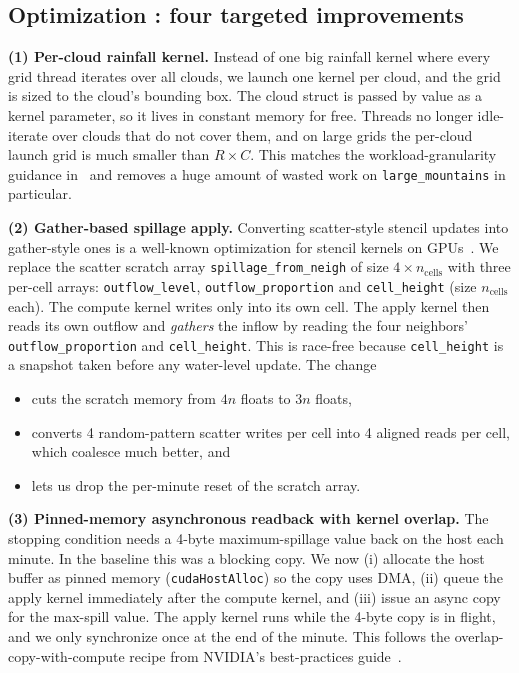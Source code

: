 \documentclass[sigconf, nonacm, review]{acmart}
\begin{document}
\subsection{Optimization : four targeted improvements}\label{sec:opt}

\textbf{(1) Per-cloud rainfall kernel.} Instead of one big
rainfall kernel where every grid thread iterates over all clouds,
we launch one kernel per cloud, and the grid is sized to
the cloud's bounding box. The cloud struct is passed by value as
a kernel parameter, so it lives in constant memory for free.
Threads no longer idle-iterate over clouds that do not cover them,
and on large grids the per-cloud launch grid is much smaller than
$R{\times}C$. This matches the workload-granularity guidance
in~\cite{kirk2016programming} and removes a huge amount of
wasted work on \texttt{large\_mountains} in particular.

\textbf{(2) Gather-based spillage apply.} Converting
scatter-style stencil updates into gather-style ones is a
well-known optimization for stencil kernels on GPUs~\cite{datta2008stencil}.
We replace the scatter scratch array
\texttt{spillage\_from\_neigh} of size $4{\times}n_\text{cells}$
with three per-cell arrays: \texttt{outflow\_level},
\texttt{outflow\_proportion} and \texttt{cell\_height} (size
$n_\text{cells}$ each). The compute kernel writes only into
its own cell. The apply kernel then reads its own outflow and
\emph{gathers} the inflow by reading the four neighbors'
\texttt{outflow\_proportion} and \texttt{cell\_height}. This is
race-free because \texttt{cell\_height} is a snapshot taken
before any water-level update. The change
\begin{itemize}
  \item cuts the scratch memory from $4n$ floats to $3n$ floats,
  \item converts 4 random-pattern scatter writes per cell into 4
    aligned reads per cell, which coalesce much better, and
  \item lets us drop the per-minute reset of the scratch array.
\end{itemize}

\textbf{(3) Pinned-memory asynchronous readback with kernel
overlap.} The stopping condition needs a 4-byte maximum-spillage
value back on the host each minute. In the baseline this was a
blocking copy. We now (i) allocate the host buffer as pinned
memory (\texttt{cudaHostAlloc}) so the copy uses DMA, (ii) queue
the apply kernel immediately after the compute kernel, and
(iii) issue an async copy for the max-spill value. The apply
kernel runs while the 4-byte copy is in flight, and we only
synchronize once at the end of the minute. This follows the
overlap-copy-with-compute recipe from NVIDIA's best-practices
guide~\cite{nvidia_best_practices}.
\end{document}
